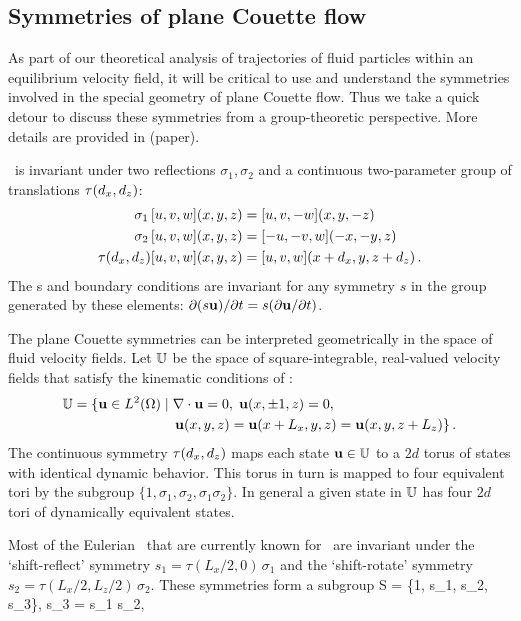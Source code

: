 \documentclass[letter,10pt,openany]{article}
\begin{document}
\subsection{Symmetries of plane Couette flow}
\label{PCF_symm}
As part of our theoretical analysis of trajectories of fluid particles within an equilibrium velocity field, it will be critical to use and understand the symmetries involved in the special geometry of plane Couette flow. Thus we take a quick detour to discuss these symmetries from a group-theoretic perspective. More details are provided in (paper).


\PCf\ is invariant under two reflections $\sigma_1,\sigma_2$ and a
continuous two-parameter group of translations $\tau(d_x, d_z)$:
\begin{align}
\sigma_1 \, [u,v,w](x,y,z) &= [u, v,-w](x,y,-z) \nonumber \\
\sigma_2 \, [u,v,w](x,y,z) &= [-u,-v,w](-x,-y,z)  \label{reflSfit1}\\
\tau(d_x, d_z)[u,v,w](x,y,z) &= [u,v,w](x+d_x,y,z+d_z) \nonumber\,.
\end{align}
The \NSe s and boundary conditions are invariant for any symmetry $s$
in the group generated by these elements:
$\partial (s {\bf u}) / \partial t = s (\partial {\bf u} / \partial t)$.

The plane Couette symmetries can be interpreted geometrically in the space of
fluid velocity fields. Let $\mathbb{U}$ be the space of
square-integrable, real-valued velocity fields that satisfy the kinematic
conditions of \pCf:
\begin{align}
 \bbU  &= \{\bu \in L^2(\Omega) \; | \; \grad \cdot \bu = 0,
               \; \bu(x, \pm 1, z) = 0, \notag  \\
         &\phantom{=} {} \qquad \qquad \qquad \; \; %
          \bu(x, y, z) = \bu(x+L_x, y, z) = \bu(x, y, z + L_z)\}  \,.
\end{align} 
The continuous symmetry $\tau(d_x, d_z)$ maps each state
${\bf u} \in \mathbb{U}$ to a $2d$ torus of states with identical dynamic
behavior. This torus in turn is mapped to four equivalent tori by
the subgroup $\{1,\sigma_1,\sigma_2, \sigma_1 \sigma_2\}$. In
general a given state in $\mathbb{U}$ has four $2d$ tori of dynamically
equivalent states.

Most of the Eulerian \eqva\ that are currently known for \pCf\
are invariant under the `shift-reflect' symmetry
$s_1 = \tau(L_x/2,0) \, \sigma_1$ and the `shift-rotate' symmetry
$s_2 = \tau(L_x/2,L_z/2) \, \sigma_2$.  These symmetries form a subgroup
\beq
S = \{1, s_1, s_2, s_3\}, \qquad s_3 = s_1 s_2, 
\eeq
\end{document}
